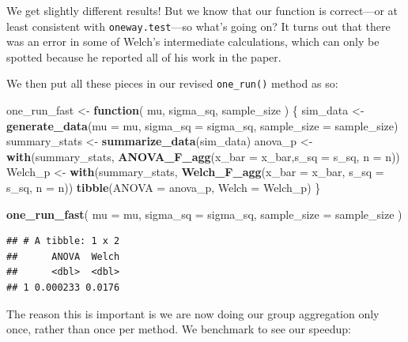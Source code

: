 \documentclass[
]{book}
\newenvironment{Shaded}{\begin{snugshade}}{\end{snugshade}}
\newcommand{\AttributeTok}[1]{\textcolor[rgb]{0.13,0.29,0.53}{#1}}
\newcommand{\ControlFlowTok}[1]{\textcolor[rgb]{0.13,0.29,0.53}{\textbf{#1}}}
\newcommand{\FunctionTok}[1]{\textcolor[rgb]{0.13,0.29,0.53}{\textbf{#1}}}
\newcommand{\NormalTok}[1]{#1}
\newcommand{\OtherTok}[1]{\textcolor[rgb]{0.56,0.35,0.01}{#1}}
\begin{document}
We get slightly different results! But we know that our function is correct---or at least consistent with \texttt{oneway.test}---so what's going on? It turns out that there was an error in some of Welch's intermediate calculations, which can only be spotted because he reported all of his work in the paper.

We then put all these pieces in our revised \texttt{one\_run()} method as so:

\begin{Shaded}
\begin{Highlighting}[]
\NormalTok{one\_run\_fast }\OtherTok{\textless{}{-}} \ControlFlowTok{function}\NormalTok{( mu, sigma\_sq, sample\_size ) \{}
\NormalTok{  sim\_data }\OtherTok{\textless{}{-}} \FunctionTok{generate\_data}\NormalTok{(}\AttributeTok{mu =}\NormalTok{ mu, }\AttributeTok{sigma\_sq =}\NormalTok{ sigma\_sq,}
                            \AttributeTok{sample\_size =}\NormalTok{ sample\_size)}
\NormalTok{  summary\_stats }\OtherTok{\textless{}{-}} \FunctionTok{summarize\_data}\NormalTok{(sim\_data)}
\NormalTok{  anova\_p }\OtherTok{\textless{}{-}} \FunctionTok{with}\NormalTok{(summary\_stats, }
                  \FunctionTok{ANOVA\_F\_agg}\NormalTok{(}\AttributeTok{x\_bar =}\NormalTok{ x\_bar,}\AttributeTok{s\_sq =}\NormalTok{ s\_sq, }\AttributeTok{n =}\NormalTok{ n))}
\NormalTok{  Welch\_p }\OtherTok{\textless{}{-}} \FunctionTok{with}\NormalTok{(summary\_stats, }
                  \FunctionTok{Welch\_F\_agg}\NormalTok{(}\AttributeTok{x\_bar =}\NormalTok{ x\_bar, }\AttributeTok{s\_sq =}\NormalTok{ s\_sq, }\AttributeTok{n =}\NormalTok{ n))}
  \FunctionTok{tibble}\NormalTok{(}\AttributeTok{ANOVA =}\NormalTok{ anova\_p, }\AttributeTok{Welch =}\NormalTok{ Welch\_p)}
\NormalTok{\}}

\FunctionTok{one\_run\_fast}\NormalTok{( }\AttributeTok{mu =}\NormalTok{ mu, }\AttributeTok{sigma\_sq =}\NormalTok{ sigma\_sq,}
              \AttributeTok{sample\_size =}\NormalTok{ sample\_size )}
\end{Highlighting}
\end{Shaded}

\begin{verbatim}
## # A tibble: 1 x 2
##      ANOVA  Welch
##      <dbl>  <dbl>
## 1 0.000233 0.0176
\end{verbatim}

The reason this is important is we are now doing our group aggregation only once, rather than once per method.
We benchmark to see our speedup:
\end{document}

